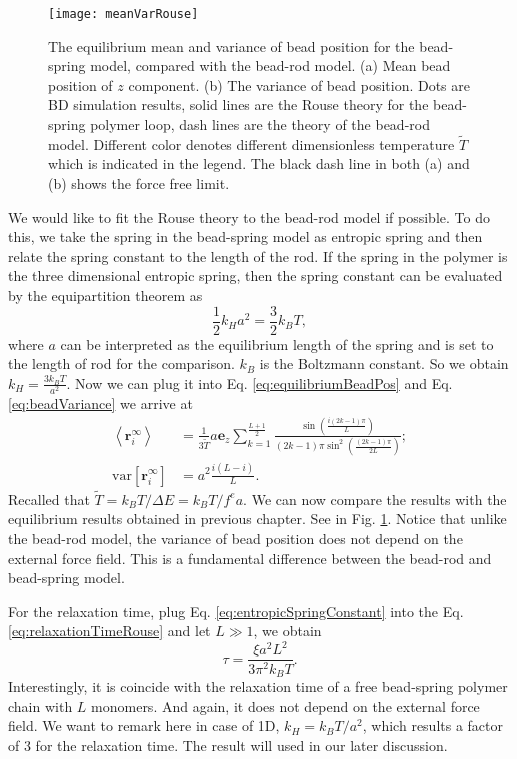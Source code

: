 \begin{figure}[htpb]
    \centering
    \texttt{[image: meanVarRouse]}
    \caption{The equilibrium mean and variance of bead position for the bead-spring model, compared with the bead-rod model. (a) Mean bead position of $z$ component. (b) The variance of bead position. Dots are BD simulation results, solid lines are the Rouse theory for the bead-spring polymer loop, dash lines are the theory of the bead-rod model. Different color denotes different dimensionless temperature $\tilde{T}$ which is indicated in the legend. The black dash line in both (a) and (b) shows the force free limit. }
    \label{fig:meanVarRouse}
\end{figure}
We would like to fit the Rouse theory to the bead-rod model if possible. To do this, we take the spring in the bead-spring model as entropic spring and then relate the spring constant to the length of the rod. If the spring in the polymer is the three dimensional entropic spring, then the spring constant can be evaluated by the equipartition theorem as
\begin{equation}
    \label{eq:entropicSpringConstant}
    \frac{1}{2} k_H a^2 = \frac{3}{2} k_B T,
\end{equation}
where $a$ can be interpreted as the equilibrium length of the spring and is set to the length of rod for the comparison. $k_B$ is the Boltzmann constant. So we obtain $k_H = \frac{3k_B T}{a^2}$. Now we can plug it into Eq. \eqref{eq:equilibriumBeadPos} and Eq. \eqref{eq:beadVariance} we arrive at
\begin{subequations}
    \label{eq:beadspringMeanVar}
    \begin{align}
    \left<\mathbf{r}_i^\infty\right> & = 
    \frac{1}{3\tilde{T}}a\mathbf{e}_z \sum_{k=1}^{\frac{L+1}{2}}\frac{\sin\left(\frac{i(2k-1)\pi}{L}\right)} {(2k-1)\pi\sin^2\left(\frac{(2k-1)\pi}{2L}\right)}; \\
    \text{var}\left[\mathbf{r}_i^{\infty}\right] & = a^2\frac{i(L-i)}{L}.
    \end{align}
\end{subequations}
Recalled that $\tilde{T} = k_B T / \Delta E = k_B T / f^e a$. We can now compare the results with the equilibrium results obtained in previous chapter. See in Fig. \ref{fig:meanVarRouse}. Notice that unlike the bead-rod model, the variance of bead position does not depend on the external force field. This is a fundamental difference between the bead-rod and bead-spring model.

For the relaxation time, plug Eq. \eqref{eq:entropicSpringConstant} into the Eq. \eqref{eq:relaxationTimeRouse} and let $L\gg 1$, we obtain
\begin{equation}
    \label{eq:relaxationTimeRouseRod}
    \tau = \frac{\xi a^2 L^2}{3 \pi^2 k_B T}. 
\end{equation}
Interestingly, it is coincide with the relaxation time of a free bead-spring polymer chain with $L$ monomers. And again, it does not depend on the external force field. We want to remark here in case of 1D, $k_H = k_B T / a^2$, which results a factor of $3$ for the relaxation time. The result will used in our later discussion. 

